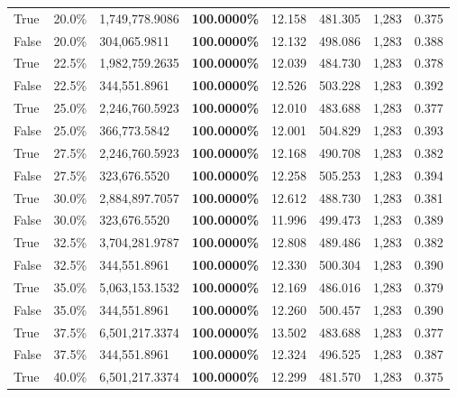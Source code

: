 \begin{table}[H]
\begin{tabular}{lllrllll}
\cline{1-8}
True & 20.0\% & 1,749,778.9086 & \bfseries \color{red} 100.0000\% & 12.158 & 481.305 & 1,283 & 0.375 \\
\cline{1-8}
False & 20.0\% & \color{red} 304,065.9811 & \bfseries \color{red} 100.0000\% & 12.132 & 498.086 & 1,283 & 0.388 \\
\cline{1-8}
True & 22.5\% & 1,982,759.2635 & \bfseries \color{red} 100.0000\% & 12.039 & 484.730 & 1,283 & 0.378 \\
\cline{1-8}
False & 22.5\% & 344,551.8961 & \bfseries \color{red} 100.0000\% & 12.526 & 503.228 & 1,283 & 0.392 \\
\cline{1-8}
True & 25.0\% & 2,246,760.5923 & \bfseries \color{red} 100.0000\% & 12.010 & 483.688 & 1,283 & 0.377 \\
\cline{1-8}
False & 25.0\% & 366,773.5842 & \bfseries \color{red} 100.0000\% & 12.001 & 504.829 & 1,283 & 0.393 \\
\cline{1-8}
True & 27.5\% & 2,246,760.5923 & \bfseries \color{red} 100.0000\% & 12.168 & 490.708 & 1,283 & 0.382 \\
\cline{1-8}
False & 27.5\% & 323,676.5520 & \bfseries \color{red} 100.0000\% & 12.258 & 505.253 & 1,283 & 0.394 \\
\cline{1-8}
True & 30.0\% & 2,884,897.7057 & \bfseries \color{red} 100.0000\% & 12.612 & 488.730 & 1,283 & 0.381 \\
\cline{1-8}
False & 30.0\% & 323,676.5520 & \bfseries \color{red} 100.0000\% & 11.996 & 499.473 & 1,283 & 0.389 \\
\cline{1-8}
True & 32.5\% & 3,704,281.9787 & \bfseries \color{red} 100.0000\% & 12.808 & 489.486 & 1,283 & 0.382 \\
\cline{1-8}
False & 32.5\% & 344,551.8961 & \bfseries \color{red} 100.0000\% & 12.330 & 500.304 & 1,283 & 0.390 \\
\cline{1-8}
True & 35.0\% & 5,063,153.1532 & \bfseries \color{red} 100.0000\% & 12.169 & 486.016 & 1,283 & 0.379 \\
\cline{1-8}
False & 35.0\% & 344,551.8961 & \bfseries \color{red} 100.0000\% & 12.260 & 500.457 & 1,283 & 0.390 \\
\cline{1-8}
True & 37.5\% & 6,501,217.3374 & \bfseries \color{red} 100.0000\% & 13.502 & 483.688 & 1,283 & 0.377 \\
\cline{1-8}
False & 37.5\% & 344,551.8961 & \bfseries \color{red} 100.0000\% & 12.324 & 496.525 & 1,283 & 0.387 \\
\cline{1-8}
True & 40.0\% & 6,501,217.3374 & \bfseries \color{red} 100.0000\% & 12.299 & 481.570 & 1,283 & 0.375 \\

\end{tabular}
\end{table}
